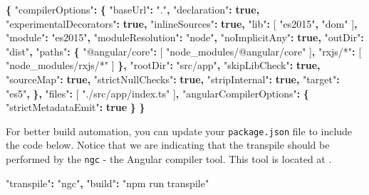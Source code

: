 \documentclass[]{book}
\newenvironment{Shaded}{\begin{snugshade}}{\end{snugshade}}
\newcommand{\KeywordTok}[1]{\textcolor[rgb]{0.13,0.29,0.53}{\textbf{#1}}}
\newcommand{\StringTok}[1]{\textcolor[rgb]{0.31,0.60,0.02}{#1}}
\newcommand{\OperatorTok}[1]{\textcolor[rgb]{0.81,0.36,0.00}{\textbf{#1}}}
\newcommand{\NormalTok}[1]{#1}
\theoremstyle{definition}
\theoremstyle{definition}
\theoremstyle{definition}
\theoremstyle{remark}
\begin{document}
\begin{Shaded}
\begin{Highlighting}[]
\OperatorTok{\{}
  \StringTok{"compilerOptions"}\OperatorTok{:} \OperatorTok{\{}
    \StringTok{"baseUrl"}\OperatorTok{:} \StringTok{"."}\OperatorTok{,}
    \StringTok{"declaration"}\OperatorTok{:} \KeywordTok{true}\OperatorTok{,}
    \StringTok{"experimentalDecorators"}\OperatorTok{:} \KeywordTok{true}\OperatorTok{,}
    \StringTok{"inlineSources"}\OperatorTok{:} \KeywordTok{true}\OperatorTok{,}
    \StringTok{"lib"}\OperatorTok{:}\NormalTok{ [}
      \StringTok{"es2015"}\OperatorTok{,}
      \StringTok{"dom"}
\NormalTok{    ]}\OperatorTok{,}
    \StringTok{"module"}\OperatorTok{:} \StringTok{"es2015"}\OperatorTok{,}
    \StringTok{"moduleResolution"}\OperatorTok{:} \StringTok{"node"}\OperatorTok{,}
    \StringTok{"noImplicitAny"}\OperatorTok{:} \KeywordTok{true}\OperatorTok{,}
    \StringTok{"outDir"}\OperatorTok{:} \StringTok{"dist"}\OperatorTok{,}
    \StringTok{"paths"}\OperatorTok{:} \OperatorTok{\{}
      \StringTok{"@angular/core"}\OperatorTok{:}\NormalTok{ [}
        \StringTok{"node_modules/@angular/core"}
\NormalTok{      ]}\OperatorTok{,}
      \StringTok{"rxjs/*"}\OperatorTok{:}\NormalTok{ [}
        \StringTok{"node_modules/rxjs/*"}
\NormalTok{      ]}
    \OperatorTok{\},}
    \StringTok{"rootDir"}\OperatorTok{:} \StringTok{"src/app"}\OperatorTok{,}
    \StringTok{"skipLibCheck"}\OperatorTok{:} \KeywordTok{true}\OperatorTok{,}
    \StringTok{"sourceMap"}\OperatorTok{:} \KeywordTok{true}\OperatorTok{,}
    \StringTok{"strictNullChecks"}\OperatorTok{:} \KeywordTok{true}\OperatorTok{,}
    \StringTok{"stripInternal"}\OperatorTok{:} \KeywordTok{true}\OperatorTok{,}
    \StringTok{"target"}\OperatorTok{:} \StringTok{"es5"}\OperatorTok{,}
  \OperatorTok{\},}
  \StringTok{"files"}\OperatorTok{:}\NormalTok{ [}
    \StringTok{"./src/app/index.ts"}
\NormalTok{  ]}\OperatorTok{,}
  \StringTok{"angularCompilerOptions"}\OperatorTok{:} \OperatorTok{\{}
    \StringTok{"strictMetadataEmit"}\OperatorTok{:} \KeywordTok{true}
  \OperatorTok{\}}
\OperatorTok{\}}
\end{Highlighting}
\end{Shaded}

For better build automation, you can update your \texttt{package.json}
file to include the code below. Notice that we are indicating that the
transpile should be performed by the \texttt{ngc} - the Angular compiler
tool. This tool is located at .

\begin{Shaded}
\begin{Highlighting}[]
\StringTok{"transpile"}\OperatorTok{:} \StringTok{"ngc"}\OperatorTok{,}
\StringTok{"build"}\OperatorTok{:} \StringTok{"npm run transpile"}
\end{Highlighting}
\end{Shaded}
\end{document}
